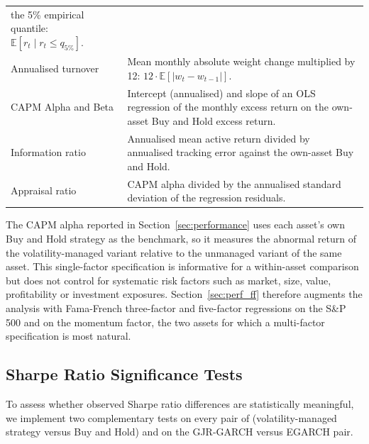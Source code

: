 \documentclass[12pt, a4paper]{article}
\newcommand{\E}{\mathbb{E}}
\begin{document}
\begin{table}[H]
\begin{tabularx}{\textwidth}{lX}
                              the 5\% empirical quantile:
                              $\E[r_t \mid r_t \leq q_{5\%}]$. \\
    Annualised turnover     & Mean monthly absolute weight change multiplied by 12:
                              $12 \cdot \E[|w_t - w_{t-1}|]$. \\
    CAPM Alpha and Beta     & Intercept (annualised) and slope of an OLS regression of
                              the monthly excess return on the own-asset Buy and Hold
                              excess return. \\
    Information ratio       & Annualised mean active return divided by annualised tracking
                              error against the own-asset Buy and Hold. \\
    Appraisal ratio         & CAPM alpha divided by the annualised standard deviation of
                              the regression residuals. \\
    \bottomrule
  \end{tabularx}
\end{table}

\noindent
The CAPM alpha reported in Section~\ref{sec:performance} uses each asset's own Buy and
Hold strategy as the benchmark, so it measures the abnormal return of the
volatility-managed variant relative to the unmanaged variant of the same asset. This
single-factor specification is informative for a within-asset comparison but does not
control for systematic risk factors such as market, size, value, profitability or
investment exposures. Section~\ref{sec:perf_ff} therefore augments the analysis with
Fama-French three-factor and five-factor regressions on the S\&P 500 and on the momentum
factor, the two assets for which a multi-factor specification is most natural.

\subsection{Sharpe Ratio Significance Tests}
\label{sec:sr_tests}

To assess whether observed Sharpe ratio differences are statistically meaningful, we
implement two complementary tests on every pair of (volatility-managed strategy versus
Buy and Hold) and on the GJR-GARCH versus EGARCH pair.
\end{document}
